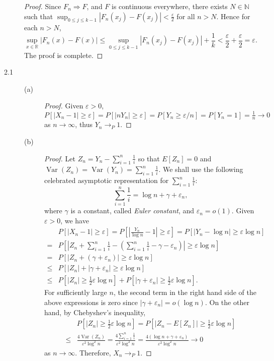 \documentclass{article}
\newcommand{\eps}{\varepsilon}
\newcommand{\real}{\mathbb{R}}
\newcommand{\nn}{\mathbb{N}}
\DeclareMathOperator*{\Var}{Var}
\theoremstyle{definition}
\theoremstyle{plain}
\theoremstyle{remark}
\begin{document}
\begin{description}
\begin{proof}
Since $F_n \Rightarrow F$, and $F$ is continuous everywhere, there exists $N \in \nn$ such that $\sup_{0 \leq j \leq k - 1}|F_n(x_j) - F(x_j)| < \frac{\eps}{2}$ for all $n > N$. Hence for each $n > N$, 
$$\sup_{x \in \real}|F_n(x) - F(x)| \leq \sup_{0 \leq j \leq k - 1}|F_n(x_j) - F(x_j)| + \frac{1}{k} < \frac{\eps}{2} + \frac{\eps}{2} = \eps.$$
The proof is complete.
\end{proof}

\item[2.1] 
\begin{description}
\item[(a)] 
\begin{proof}
Given $\eps > 0$, $P[|X_n - 1| \geq \eps] = P[|nY_n| \geq \eps] = P[Y_n \geq \eps/n] = P[Y_n = 1] = \frac{1}{n} \to 0$ as $n \to \infty$, thus $Y_n \to_P 1$. 
\end{proof}

\item[(b)] 
\begin{proof}
Let $Z_n = Y_n - \sum_{i = 1}^n \frac{1}{i}$ so that $E[Z_n] = 0$ and $\Var(Z_n) = \Var(Y_n) = \sum_{i = 1}^n \frac{1}{i}$. We shall use the following celebrated asymptotic representation for $\sum_{i = 1}^n \frac{1}{i}$:
\begin{equation*}
\sum_{i = 1}^n \frac{1}{i} = \log n + \gamma + \eps_n,
\end{equation*}
where $\gamma$ is a constant, called \emph{Euler constant}, and $\eps_n = o(1)$. Given $\eps > 0$, we have
\begin{align*}
& P[|X_n - 1| \geq \eps] = P\left[\left|\frac{Y_n}{\log n} - 1\right| \geq \eps\right] = P[|Y_n - \log n| \geq \eps\log n] \\
= & P\left[\left|Z_n + \sum_{i = 1}^n \frac{1}{i} - \left(\sum_{i = 1}^n \frac{1}{i} - \gamma - \eps_n\right)\right| \geq \eps \log n\right] \\
= & P[|Z_n + (\gamma + \eps_n)| \geq \eps\log n] \\
\leq & P[|Z_n| + |\gamma + \eps_n| \geq \eps\log n] \\
\leq & P\left[|Z_n| \geq \frac{1}{2}\eps\log n\right] + P\left[|\gamma + \eps_n| \geq \frac{1}{2}\eps\log n\right].
\end{align*}
For sufficiently large $n$, the second term in the right hand side of the above expressions is zero since $|\gamma + \eps_n| = o(\log n)$. On the other hand, by Chebyshev's inequality,
\begin{align*}
& P\left[|Z_n| \geq \frac{1}{2}\eps\log n\right] = P\left[|Z_n - E[Z_n]| \geq \frac{1}{2}\eps\log n\right] \\
\leq & \frac{4\Var(Z_n)}{\eps^2 \log^2n} = \frac{4\sum_{i = 1}^n \frac{1}{i}}{\eps^2 \log^2 n} = \frac{4(\log n + \gamma + \eps_n)}{\eps^2\log^2 n} \to 0
\end{align*}
as $n \to \infty$. Therefore, $X_n \to_P 1$. 
\end{proof}


\end{description}
\end{description}
\end{document}
